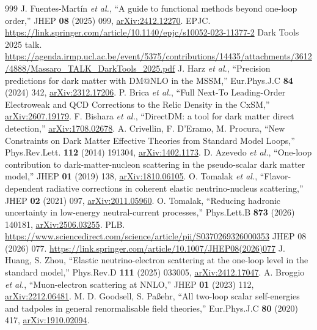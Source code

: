 \documentclass[a4paper,10pt]{ltjsarticle}
\begin{document}
\begin{thebibliography}{999}
 J. Fuentes-Martín \textit{et al.}, ``A guide to functional methods beyond one-loop order,'' JHEP \textbf{08} (2025) 099, \href{https://arxiv.org/abs/2412.12270}{arXiv:2412.12270}.
 EPJC. \url{https://link.springer.com/article/10.1140/epjc/s10052-023-11377-2}
 Dark Tools 2025 talk. \url{https://agenda.irmp.ucl.ac.be/event/5375/contributions/14435/attachments/3612/4888/Massaro_TALK_DarkTools_2025.pdf}
 J. Harz \textit{et al.}, ``Precision predictions for dark matter with DM@NLO in the MSSM,'' Eur.Phys.J.C \textbf{84} (2024) 342, \href{https://arxiv.org/abs/2312.17206}{arXiv:2312.17206}.
 P. Brica \textit{et al.}, ``Full Next-To Leading-Order Electroweak and QCD Corrections to the Relic Density in the CxSM,'' \href{https://arxiv.org/abs/2607.19179}{arXiv:2607.19179}.
 F. Bishara \textit{et al.}, ``DirectDM: a tool for dark matter direct detection,'' \href{https://arxiv.org/abs/1708.02678}{arXiv:1708.02678}.
 A. Crivellin, F. D'Eramo, M. Procura, ``New Constraints on Dark Matter Effective Theories from Standard Model Loops,'' Phys.Rev.Lett. \textbf{112} (2014) 191304, \href{https://arxiv.org/abs/1402.1173}{arXiv:1402.1173}.
 D. Azevedo \textit{et al.}, ``One-loop contribution to dark-matter-nucleon scattering in the pseudo-scalar dark matter model,'' JHEP \textbf{01} (2019) 138, \href{https://arxiv.org/abs/1810.06105}{arXiv:1810.06105}.
 O. Tomalak \textit{et al.}, ``Flavor-dependent radiative corrections in coherent elastic neutrino-nucleus scattering,'' JHEP \textbf{02} (2021) 097, \href{https://arxiv.org/abs/2011.05960}{arXiv:2011.05960}.
 O. Tomalak, ``Reducing hadronic uncertainty in low-energy neutral-current processes,'' Phys.Lett.B \textbf{873} (2026) 140181, \href{https://arxiv.org/abs/2506.03255}{arXiv:2506.03255}.
 PLB. \url{https://www.sciencedirect.com/science/article/pii/S0370269326000353}
 JHEP 08 (2026) 077. \url{https://link.springer.com/article/10.1007/JHEP08(2026)077}
 J. Huang, S. Zhou, ``Elastic neutrino-electron scattering at the one-loop level in the standard model,'' Phys.Rev.D \textbf{111} (2025) 033005, \href{https://arxiv.org/abs/2412.17047}{arXiv:2412.17047}.
 A. Broggio \textit{et al.}, ``Muon-electron scattering at NNLO,'' JHEP \textbf{01} (2023) 112, \href{https://arxiv.org/abs/2212.06481}{arXiv:2212.06481}.
 M. D. Goodsell, S. Paßehr, ``All two-loop scalar self-energies and tadpoles in general renormalisable field theories,'' Eur.Phys.J.C \textbf{80} (2020) 417, \href{https://arxiv.org/abs/1910.02094}{arXiv:1910.02094}.

\end{thebibliography}
\end{document}
